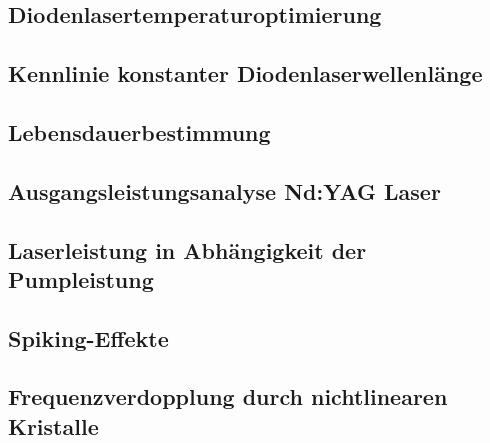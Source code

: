 \documentclass[../main.tex]{subfiles}
\begin{document}
    \subsection{Diodenlasertemperaturoptimierung}\label{subsec:1-1:Diodenlasertemperaturoptimierung}
        

    \subsection{Kennlinie konstanter Diodenlaserwellenlänge}\label{subsec:1-2:KennlinieKonstanterDiodenlaserwellenlaenge}
        

    \subsection{Lebensdauerbestimmung}\label{subsec:1-3:Lebensdauerbestimmung}
        

    \subsection{Ausgangsleistungsanalyse Nd:YAG Laser}\label{subsec:1-4:AusgangsleistungsanalyseNdYAGLaser}
        

    \subsection{Laserleistung in Abhängigkeit der Pumpleistung}
    

    

    

    


    \subsection{Spiking-Effekte}
    


    \subsection{Frequenzverdopplung durch nichtlinearen Kristalle}
    

    
    
\end{document}
